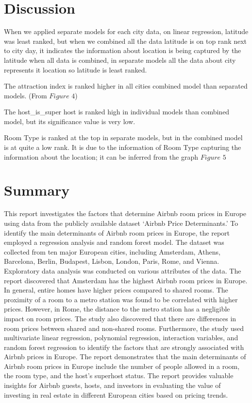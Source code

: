 \documentclass[
]{article}
\begin{document}
\hypertarget{discussion}{%
\section{Discussion}\label{discussion}}

When we applied separate models for each city data, on linear
regression, latitude was least ranked, but when we combined all the data
latitude is on top rank next to city day, it indicates the information
about location is being captured by the latitude when all data is
combined, in separate models all the data about city represents it
location so latitude is least ranked.

The attraction index is ranked higher in all cities combined model than
separated models. (From \(Figure\) \(4\))

The host\_is\_super host is ranked high in individual models than
combined model, but its significance value is very low.

Room Type is ranked at the top in separate models, but in the combined
model is at quite a low rank. It is due to the information of Room Type
capturing the information about the location; it can be inferred from
the graph \(Figure\) \(5\)

\hypertarget{summary}{%
\section{Summary}\label{summary}}

This report investigates the factors that determine Airbnb room prices
in Europe using data from the publicly available dataset `Airbnb Price
Determinants.' To identify the main determinants of Airbnb room prices
in Europe, the report employed a regression analysis and random forest
model. The dataset was collected from ten major European cities,
including Amsterdam, Athens, Barcelona, Berlin, Budapest, Lisbon,
London, Paris, Rome, and Vienna. Exploratory data analysis was conducted
on various attributes of the data. The report discovered that Amsterdam
has the highest Airbnb room prices in Europe. In general, entire homes
have higher prices compared to shared rooms. The proximity of a room to
a metro station was found to be correlated with higher prices. However,
in Rome, the distance to the metro station has a negligible impact on
room prices. The study also discovered that there are differences in
room prices between shared and non-shared rooms. Furthermore, the study
used multivariate linear regression, polynomial regression, interaction
variables, and random forest regression to identify the factors that are
strongly associated with Airbnb prices in Europe. The report
demonstrates that the main determinants of Airbnb room prices in Europe
include the number of people allowed in a room, the room type, and the
host's superhost status. The report provides valuable insights for
Airbnb guests, hosts, and investors in evaluating the value of investing
in real estate in different European cities based on pricing trends.
\end{document}
